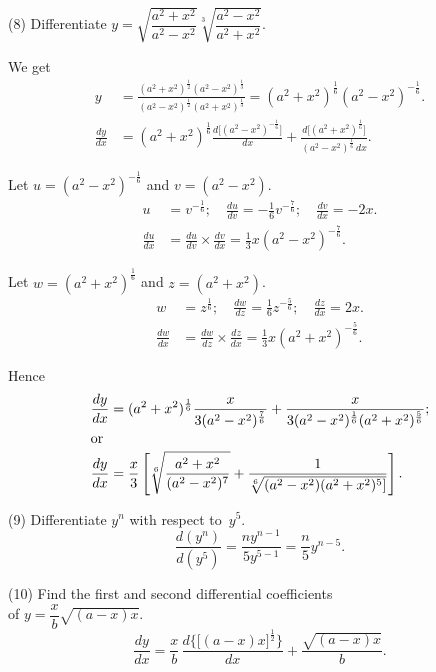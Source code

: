 \documentclass[12pt]{book}[2005/09/16]
\newcommand{\DPPageSep}[2]{\Pagelabel{#2}}
\newcommand{\Pagelabel}[1]
  {\phantomsection\label{#1}}
\newcommand{\efrac}[2]{\frac{#1}{#2}}
\begin{document}
(8) Differentiate $y=\sqrt{\dfrac{a^2+x^2}{a^2-x^2}} \sqrt[3]{\dfrac{a^2-x^2}{a^2+x^2}}$.

We get
\begin{align*}
y &= \frac{(a^2+x^2)^{\efrac{1}{2}} (a^2-x^2)^{\efrac{1}{3}}}
          {(a^2-x^2)^{\efrac{1}{2}} (a^2+x^2)^{\efrac{1}{3}}}
  = (a^2+x^2)^{\efrac{1}{6}} (a^2-x^2)^{-\efrac{1}{6}}. \\
\frac{dy}{dx}
  &= (a^2+x^2)^{\efrac{1}{6}} \frac{d\bigl[(a^2-x^2)^{-\efrac{1}{6}}\bigr]}{dx}
   + \frac{d\bigl[(a^2+x^2)^{\efrac{1}{6}}\bigr]}{(a^2-x^2)^{\efrac{1}{6}}\, dx}.
\end{align*}
\DPPageSep{084.png}{72}%

Let $u = (a^2-x^2)^{-\efrac{1}{6}}$ and $v = (a^2 - x^2)$.
\begin{align*}
u &= v^{-\efrac{1}{6}};\quad
  \frac{du}{dv} = -\frac{1}{6}v^{-\efrac{7}{6}};\quad
  \frac{dv}{dx} = -2x. \\
%
\frac{du}{dx} &= \frac{du}{dv} × \frac{dv}{dx} = \frac{1}{3}x(a^2-x^2)^{-\efrac{7}{6}}.
\end{align*}

Let $w = (a^2 + x^2)^{\efrac{1}{6}}$ and $z = (a^2 + x^2)$.
\begin{align*}
w &= z^{\efrac{1}{6}};\quad
  \frac{dw}{dz} = \frac{1}{6}z^{-\efrac{5}{6}};\quad
  \frac{dz}{dx} = 2x. \\
%
\frac{dw}{dx} &= \frac{dw}{dz} × \frac{dz}{dx} = \frac{1}{3} x(a^2 + x^2)^{-\efrac{5}{6}}.
\end{align*}

Hence
\begin{align*}
\frac{dy}{dx}
  &= (a^2+x^2)^{\efrac{1}{6}} \frac{x}{3(a^2-x^2)^{\efrac{7}{6}}}
   + \frac{x}{3(a^2-x^2)^{\efrac{1}{6}} (a^2+x^2)^{\efrac{5}{6}}}; \\
%
\intertext{or}
\frac{dy}{dx}
  &= \frac{x}{3}
     \left[\sqrt[6]{\frac{a^2+x^2}{(a^2-x^2)^7}}
           + \frac{1}{\sqrt[6]{(a^2-x^2)(a^2+x^2)^5]}} \right].
\end{align*}

(9) Differentiate $y^n$ with respect to~$y^5$.
\[
\frac{d(y^n)}{d(y^5)} = \frac{ny^{n-1}}{5y^{5-1}} = \frac{n}{5} y^{n-5}.
\]

(10)\Pagelabel{Example10} Find the first and second differential coefficients \\
of $y = \dfrac{x}{b} \sqrt{(a-x)x}$.
\[
\frac{dy}{dx}
  = \frac{x}{b}\,
    \frac{d\bigl\{\bigl[(a-x)x\bigr]^{\efrac{1}{2}}\bigr\}}{dx}
  + \frac{\sqrt{(a-x)x}}{b}.
\]
\end{document}
